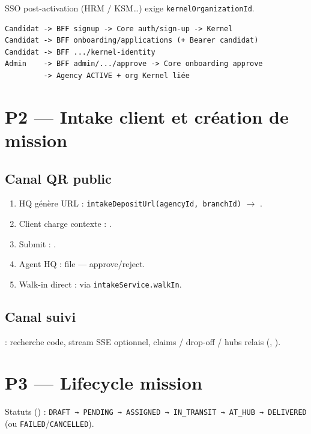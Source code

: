 SSO post-activation (HRM / KSM\ldots) exige \texttt{kernelOrganizationId}.

\begin{lstlisting}[caption={Séquence onboarding (simplifiée)}]
Candidat -> BFF signup -> Core auth/sign-up -> Kernel
Candidat -> BFF onboarding/applications (+ Bearer candidat)
Candidat -> BFF .../kernel-identity
Admin    -> BFF admin/.../approve -> Core onboarding approve
         -> Agency ACTIVE + org Kernel liée
\end{lstlisting}

\section{P2 --- Intake client et création de mission}

\subsection{Canal QR public}

\begin{enumerate}
  \item HQ génère URL : \texttt{intakeDepositUrl(agencyId, branchId)}
        $\rightarrow$ .
  \item Client charge contexte : .
  \item Submit : .
  \item Agent HQ : file  --- approve/reject.
  \item Walk-in direct :  via \texttt{intakeService.walkIn}.
\end{enumerate}

\subsection{Canal suivi}

 : recherche code, stream SSE optionnel, claims / drop-off / hubs
relais (, ).

\section{P3 --- Lifecycle mission}

Statuts () :
\texttt{DRAFT → PENDING → ASSIGNED → IN\_TRANSIT → AT\_HUB → DELIVERED}
(ou \texttt{FAILED}/\texttt{CANCELLED}).

